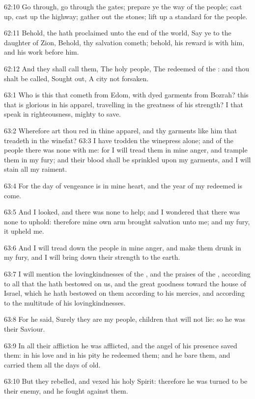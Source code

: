 62:10 Go through, go through the gates; prepare ye the way of the
people; cast up, cast up the highway; gather out the stones; lift up a
standard for the people.

62:11 Behold, the \LORD hath proclaimed unto the end of the world, Say
ye to the daughter of Zion, Behold, thy salvation cometh; behold, his
reward is with him, and his work before him.

62:12 And they shall call them, The holy people, The redeemed of the
\LORD: and thou shalt be called, Sought out, A city not forsaken.

63:1 Who is this that cometh from Edom, with dyed garments from
Bozrah?  this that is glorious in his apparel, travelling in the
greatness of his strength? I that speak in righteousness, mighty to
save.

63:2 Wherefore art thou red in thine apparel, and thy garments like
him that treadeth in the winefat?  63:3 I have trodden the winepress
alone; and of the people there was none with me: for I will tread them
in mine anger, and trample them in my fury; and their blood shall be
sprinkled upon my garments, and I will stain all my raiment.

63:4 For the day of vengeance is in mine heart, and the year of my
redeemed is come.

63:5 And I looked, and there was none to help; and I wondered that
there was none to uphold: therefore mine own arm brought salvation
unto me; and my fury, it upheld me.

63:6 And I will tread down the people in mine anger, and make them
drunk in my fury, and I will bring down their strength to the earth.

63:7 I will mention the lovingkindnesses of the \LORD, and the praises
of the \LORD, according to all that the \LORD hath bestowed on us, and
the great goodness toward the house of Israel, which he hath bestowed
on them according to his mercies, and according to the multitude of
his lovingkindnesses.

63:8 For he said, Surely they are my people, children that will not
lie: so he was their Saviour.

63:9 In all their affliction he was afflicted, and the angel of his
presence saved them: in his love and in his pity he redeemed them; and
he bare them, and carried them all the days of old.

63:10 But they rebelled, and vexed his holy Spirit: therefore he was
turned to be their enemy, and he fought against them.

